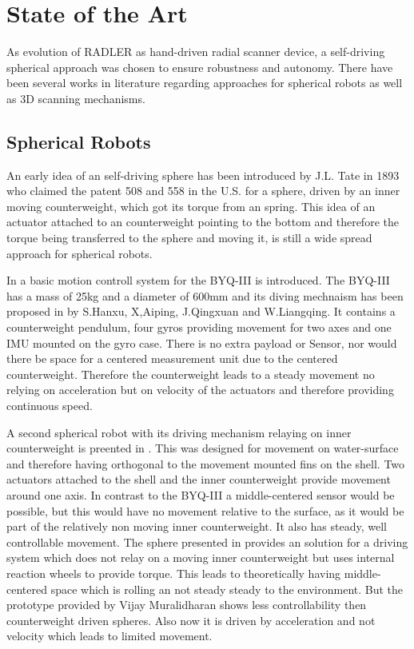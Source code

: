 \section{State of the Art}
\label{sec:stateOfTheArt}
As evolution of RADLER as hand-driven radial scanner device, a self-driving spherical approach was chosen to ensure robustness and autonomy.  There have been several works in literature regarding approaches for spherical robots as well as 3D scanning mechanisms. 

\subsection{Spherical Robots}
\label{sec:stateOfTheArt:sphericalrobots}
An early idea of an self-driving sphere has been introduced by J.L. Tate in 1893 who claimed the patent  508 and 558 in  the U.S. for a sphere, driven by an inner moving counterweight, which got its torque from an spring. This idea of an actuator attached to an counterweight pointing to the bottom and therefore the torque being transferred to the sphere and moving it, is still a wide spread approach for spherical robots.

In \cite{soa1} a basic motion controll system for the BYQ-III is introduced. The BYQ-III has a mass of 25kg and a diameter of 600mm and its diving mechnaism has been proposed in \cite{soa2} by S.Hanxu, X,Aiping, J.Qingxuan and W.Liangqing. It contains  a counterweight pendulum, four gyros providing movement for two axes and one IMU mounted on the gyro case. There is no extra payload or Sensor, nor would there be space for a centered measurement unit due to the centered counterweight. Therefore the counterweight leads to a steady movement no relying on acceleration but on velocity of the actuators and therefore providing continuous speed.

A second spherical robot with its driving mechanism relaying on inner counterweight is preented in \cite{soa3}. This was designed for movement on water-surface and therefore having orthogonal to the movement mounted fins on the shell. Two actuators attached to the shell and the inner counterweight provide movement around one axis. In contrast to the BYQ-III a middle-centered  sensor would be possible, but this would have no movement relative to the surface, as it would be part of the relatively non moving inner counterweight. It also has steady, well controllable movement. 
The sphere presented in \cite{soa4} \cite{soa5} provides an solution for a driving system which does not relay on a moving inner counterweight but uses internal reaction wheels to provide torque. This leads to theoretically having middle-centered space which is rolling an not steady steady to the environment.  But the prototype provided by Vijay Muralidharan shows less controllability then counterweight driven spheres. Also now it is driven by acceleration and not velocity which leads to limited movement.

